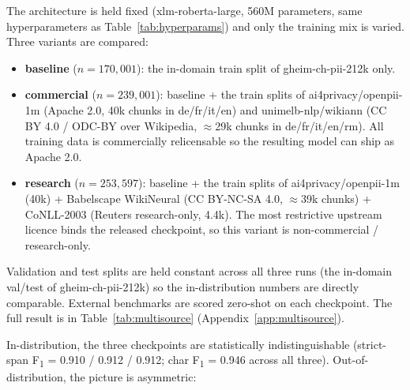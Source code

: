 \documentclass[sigconf,nonacm]{acmart}
\begin{document}
The architecture is held fixed (\textsf{xlm-roberta-large}, 560M
parameters, same hyperparameters as Table~\ref{tab:hyperparams})
and only the training mix is varied. Three variants are compared:

\begin{itemize}
  \item \textbf{baseline} ($n=170{,}001$): the in-domain train split
        of \textsf{gheim-ch-pii-212k} only.
  \item \textbf{commercial} ($n=239{,}001$): baseline + the train
        splits of \textsf{ai4privacy/openpii-1m} (Apache 2.0, 40k
        chunks in de/fr/it/en) and \textsf{unimelb-nlp/wikiann}
        (CC BY 4.0 / ODC-BY over Wikipedia, ${\approx}$29k chunks in
        de/fr/it/en/rm). All training data is commercially
        relicensable so the resulting model can ship as Apache 2.0.
  \item \textbf{research} ($n=253{,}597$): baseline + the train
        splits of \textsf{ai4privacy/openpii-1m} (40k) +
        Babelscape \textsf{WikiNeural} (CC BY-NC-SA 4.0,
        ${\approx}$39k chunks) + CoNLL-2003 (Reuters
        research-only, 4.4k). The most restrictive upstream
        licence binds the released checkpoint, so this variant is
        non-commercial / research-only.
\end{itemize}

Validation and test splits are held constant across all three
runs (the in-domain val/test of \textsf{gheim-ch-pii-212k}) so
the in-distribution numbers are directly comparable. External
benchmarks are scored zero-shot on each checkpoint. The full
result is in Table~\ref{tab:multisource} (Appendix~\ref{app:multisource}).

In-distribution, the three checkpoints are statistically
indistinguishable (strict-span F\textsubscript{1} = 0.910 / 0.912
/ 0.912; char F\textsubscript{1} = 0.946 across all three).
Out-of-distribution, the picture is asymmetric:
\end{document}
